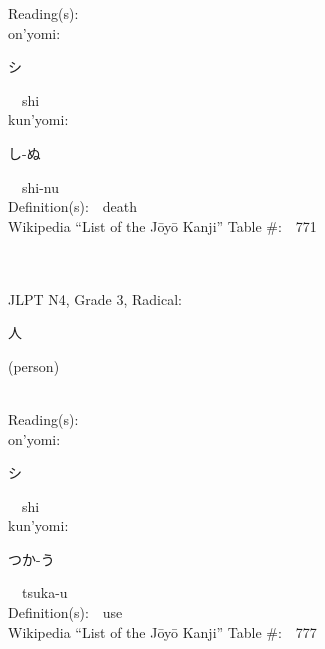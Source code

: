 \begin{multicols}{2}
Reading(s):\ \ \\
{\hspace*{1em}}on'yomi:\ \ \\
{\hspace*{2em}}{\begin{CJK}{UTF8}{min} シ \end{CJK}}\ \ shi\ \ \\
{\hspace*{1em}}kun'yomi:\ \ \\
{\hspace*{2em}}{\begin{CJK}{UTF8}{min} し-ぬ \end{CJK}}\ \ shi-nu\ \ \\
Definition(s):\ \ death \\
Wikipedia ``List of the J\=oy\=o Kanji'' Table \#:\ \ 771 \\
\ \ \\
{\fontsize{34pt}{40pt}  }\ \ \\  %
{JLPT N4, Grade 3, Radical:\ \ {\begin{CJK}{UTF8}{min} 人 \end{CJK}} (person) } \\
Reading(s):\ \ \\
{\hspace*{1em}}on'yomi:\ \ \\
{\hspace*{2em}}{\begin{CJK}{UTF8}{min} シ \end{CJK}}\ \ shi\ \ \\
{\hspace*{1em}}kun'yomi:\ \ \\
{\hspace*{2em}}{\begin{CJK}{UTF8}{min} つか-う \end{CJK}}\ \ tsuka-u\ \ \\
Definition(s):\ \ use \\
Wikipedia ``List of the J\=oy\=o Kanji'' Table \#:\ \ 777 \\
\ \ \\
{\fontsize{34pt}{40pt}  }\ \ \\  %

\end{multicols}
